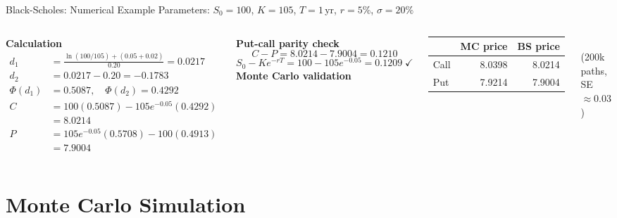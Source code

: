 \documentclass[aspectratio=169,10pt]{beamer}
\begin{document}
\begin{frame}{Black-Scholes: Numerical Example}
  Parameters: $S_0=100$, $K=105$, $T=1$\,yr, $r=5\%$, $\sigma=20\%$

  \bigskip
  \begin{columns}[T]
      \textbf{Calculation}
      \begin{align*}
        d_1 &= \frac{\ln(100/105)+(0.05+0.02)}{0.20} = 0.0217\\
        d_2 &= 0.0217 - 0.20 = -0.1783\\
        \Phi(d_1) &= 0.5087,\quad \Phi(d_2) = 0.4292\\[4pt]
        C &= 100(0.5087) - 105 e^{-0.05}(0.4292) \\
          &= \mathbf{8.0214}\\[4pt]
        P &= 105 e^{-0.05}(0.5708) - 100(0.4913) \\
          &= \mathbf{7.9004}
      \end{align*}

      \textbf{Put-call parity check}
      \[
        C - P = 8.0214 - 7.9004 = 0.1210
      \]
      \[
        S_0 - Ke^{-rT} = 100 - 105 e^{-0.05} = 0.1209\;\checkmark
      \]
      \bigskip
      \textbf{Monte Carlo validation}\\[4pt]
      \begin{tabular}{lrr}
        \toprule
        & MC price & BS price \\
        \midrule
        Call & 8.0398 & 8.0214 \\
        Put  & 7.9214 & 7.9004 \\
        \bottomrule
      \end{tabular}\\[4pt]
      \footnotesize (200k paths, SE $\approx 0.03$)
  \end{columns}
\end{frame}

\section{Monte Carlo Simulation}
\end{document}

